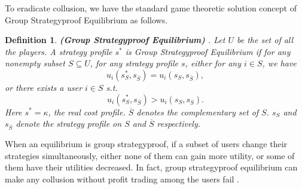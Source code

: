 \documentclass[conference]{IEEEtran}
\newtheorem{definition}{Definition}
\theoremstyle{definition}
\begin{document}
{%

To eradicate collusion, we have the standard game theoretic solution concept of Group Strategyproof Equilibrium as follows.}
\begin{definition}
\label{def:gse}
\textbf{(Group Strategyproof Equilibrium)} \cite{jain1999group} \cite{moulin2001strategyproof}. Let $U$ be the set of all the players. A strategy profile $s^*$ is Group Strategyproof Equilibrium if for any nonempty subset $S\subseteq U$, for any strategy profile $s$, either for any $i\in S$, we have
\begin{equation}
u_i(s_S^*,s_{\overline{S}})=u_i(s_S,s_{\overline{S}}),
\end{equation}
or there exists a user $i\in S$ s.t.
\begin{equation}
u_i(s_S^*,s_{\overline{S}})>u_i(s_S,s_{\overline{S}}).
\end{equation}
Here $s^*=\kappa$, the real cost profile. {\color{blue}$\overline{S}$ denotes the complementary set of $S$. $s_S$ and $s_{\overline{S}}$ denote the strategy profile on $S$ and $\overline{S}$ respectively.}
\end{definition}
When an equilibrium is group strategyproof, if a subset of users change their strategies simultaneously, either none of them can gain more utility, or some of them have their utilities decreased. In fact, group strategyproof equilibrium can make any collusion without profit trading among the users fail \cite{zhong2007designing}.
\end{document}
